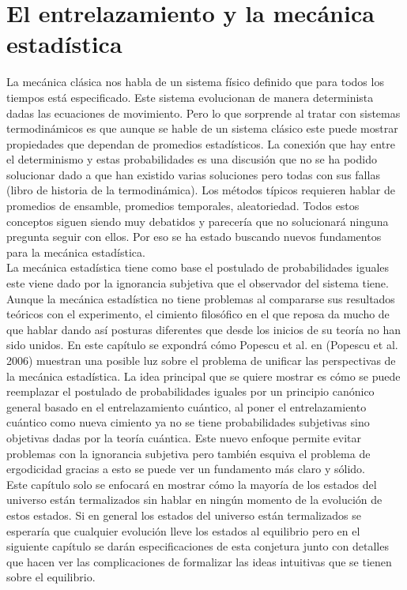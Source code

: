 \chapter{El entrelazamiento y la mecánica estadística}

La mecánica clásica nos habla de un sistema físico definido que para todos los tiempos está especificado. Este sistema evolucionan de manera determinista dadas las ecuaciones de movimiento. Pero lo que sorprende al tratar con  sistemas termodinámicos es que aunque se hable de un sistema clásico este puede mostrar propiedades que dependan de promedios estadísticos. La conexión que hay entre el determinismo y estas probabilidades es una discusión que no se ha podido solucionar dado a que han existido varias soluciones pero todas con sus fallas (libro de historia de la termodinámica). Los métodos típicos requieren hablar de promedios de ensamble, promedios temporales, aleatoriedad. Todos estos conceptos siguen siendo muy debatidos y parecería que no solucionará ninguna pregunta seguir con ellos. Por eso se ha estado buscando nuevos fundamentos para la mecánica estadística.
\\
La mecánica estadística tiene como base el postulado de probabilidades iguales este viene dado por la ignorancia subjetiva que el observador del sistema tiene. Aunque la mecánica estadística no tiene problemas al compararse sus resultados teóricos con el experimento, el cimiento filosófico en el que reposa da mucho de que hablar dando así posturas diferentes que desde los inicios de su teoría no han sido unidos. En este capítulo se expondrá cómo Popescu et al. en (Popescu et al. 2006) muestran una posible luz sobre el problema de unificar las perspectivas de la mecánica estadística. La idea principal que se quiere mostrar es cómo se puede reemplazar el postulado de probabilidades iguales por un principio canónico general basado en el entrelazamiento cuántico, al poner el entrelazamiento cuántico como nueva cimiento ya no se tiene probabilidades subjetivas sino objetivas dadas por la teoría  cuántica. Este nuevo enfoque permite evitar problemas con la ignorancia subjetiva pero también esquiva el problema de ergodicidad gracias a esto se puede ver un fundamento más claro y sólido. 
\\
Este capítulo solo se enfocará en mostrar cómo la mayoría de los estados del universo están termalizados sin hablar en ningún momento de la evolución de estos estados. Si en general los estados del universo están termalizados se esperaría que cualquier evolución lleve los estados al equilibrio pero en el siguiente capítulo se darán especificaciones de esta conjetura junto con detalles que hacen ver las complicaciones de formalizar las ideas intuitivas que se tienen sobre el equilibrio.


